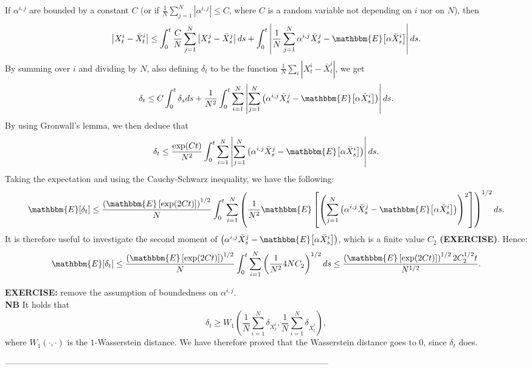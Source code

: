 \documentclass[11pt, a4paper]{article}
\begin{document}
If $\alpha^{i, j}$ are bounded by a constant $C$ (or if $\frac{1}{N} \sum_{j = 1}^N | \alpha^{i,j} | \leq C$, where $C$ is a random variable not depending on $i$ nor on $N$), then \[ \left| X^i_t - \bar{X}^i_t \right| \leq \int_0^t \frac{C}{N} \sum_{j = 1}^N \left| X^j_s - \bar{X}^j_s \right| ds + \int_0^t \left| \frac{1}{N} \sum_{j = 1}^N \alpha^{i, j} \bar{X}^j_s - \mathbbm{E} \big[ \alpha \bar{X}^i_s \big] \right| ds. \] By summing over $i$ and dividing by $N$, also defining $\delta_t$ to be the function $\frac{1}{N} \sum_i \left| X^i_t - \bar{X}^i_t \right|$, we get \[ \delta_t \leq C \int_0^t \delta_s ds + \frac{1}{N^2} \int_0^t \sum_{i = 1}^N \left| \sum_{j = 1}^N \left( \alpha^{i, j} \bar{X}^j_s - \mathbbm{E} \big[ \alpha \bar{X}^i_s \big] \right) \right| ds. \]
By using Gronwall's lemma, we then deduce that \[ \delta_t \leq \frac{\exp(C t)}{N^2} \int_0^t \sum_{i = 1}^N \left| \sum_{j = 1}^N \left( \alpha^{i, j} \bar{X}^j_s - \mathbbm{E} \big[ \alpha \bar{X}^i_s \big] \right) \right| ds. \]
Taking the expectation and using the Cauchy-Schwarz inequality, we have the following: \[ \mathbbm{E} [\delta_t] \leq \frac{ \left( \mathbbm{E} \left[ \exp(2 C t) \right] \right)^{1/2}}{N} \int_0^t \sum_{i = 1}^N \left( \frac{1}{N^2} \mathbbm{E} \left[ \left( \sum_{j = 1}^N \left( \alpha^{i, j} \bar{X}^j_s - \mathbbm{E} \big[ \alpha \bar{X}^i_s \big] \right) \right)^2 \right] \right)^{1/2} ds. \]
It is therefore useful to investigate the second moment of $\left( \alpha^{i, j} \bar{X}^j_s - \mathbbm{E} \big[ \alpha \bar{X}^i_s \big] \right)$, which is a finite value $C_2$  \textbf{(EXERCISE)}. Hence: \[ \mathbbm{E} [ \delta_t ] \leq \frac{ \left( \mathbbm{E} \left[ \exp(2 C t) \right] \right)^{1/2}}{N} \int_0^t \sum_{i = 1}^N \left( \frac{1}{N^2} 4 N C_2 \right)^{1/2} ds \leq \frac{\left( \mathbbm{E} \left[ \exp(2 C t) \right] \right)^{1/2} 2 C_2^{1/2} t}{N^{1/2}} . \]

\textbf{EXERCISE:}  remove the assumption of  boundedness on $\alpha^{i, j}$. \\

\textbf{NB} It holds that \[ \delta_t \geq W_1 \left( \frac{1}{N} \sum_{i = 1}^N \delta_{X^i_t}, \frac{1}{N} \sum_{i = 1}^N \delta_{\bar{X}^i_t} \right), \] where $W_1(\cdot, \cdot)$ is the $1$-Wasserstein distance. We have therefore proved that the Wasserstein distance goes to $0$, since $\delta_t$ does. \\

\begin{center}
------------------------------------------------------------------------------------------------------------------ \\
\end{center}
\end{document}

